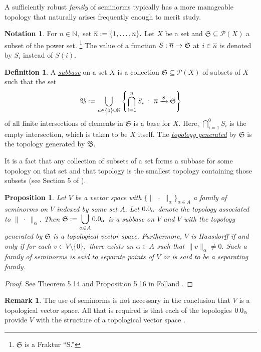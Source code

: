 \documentclass[12pt]{article}
\edef\t{\pgfmathresult}%
\theoremstyle{theorem}
\newtheorem{proposition}[equation]{Proposition}
\theoremstyle{definition}
\newtheorem{definition}[equation]{Definition}
\newtheorem{remark}[equation]{Remark}
\newtheorem{notation}[equation]{Notation}
\numberwithin{equation}{section}
\let\a=\alpha \let\b=\beta \let\g=\gamma \let\de=\delta \let\e=\epsilon
\newcommand{\be}{\begin{equation}}
\newcommand{\ee}{\end{equation}}
\newcommand{\bn}{\begin{proposition}}
\newcommand{\en}{\end{proposition}}
\newcommand{\bd}{\begin{definition}}
\newcommand{\ed}{\end{definition}}
\newcommand{\bprf}{\begin{proof}}
\newcommand{\eprf}{\end{proof}}
\newcommand{\br}{\begin{remark}}
\newcommand{\er}{\end{remark}}
\newcommand{\<}{\langle}
\renewcommand{\>}{\rangle}
\def\N{{{\mathbb N}}}
\newcommand{\ds}{\displaystyle}
\begin{document}
A sufficiently robust 
\emph{family} of seminorms typically has a more manageable topology
that naturally arises frequently enough to merit study. 

\begin{notation}
\label{not:nset}
For $n\in\N,$ set $\overline n:=\{1,\dots,n\}.$ Let $X$ be a set and 
$\mathfrak{S}\subseteq\mathcal{P}(X)$ a subset of the power set.%
\footnote{$\mathfrak{S}$ is a Fraktur ``S.''}
The value of a function $S:\overline n\to\mathfrak{S}$ at $i\in\overline n$ is
denoted by $S_{i}$ instead of $S(i).$ 
\end{notation}

\bd
\label{defn:subbase}
A \emph{\uline{subbase}} on a set $X$ is
a collection $\mathfrak{S}\subseteq\mathcal{P}(X)$ of
subsets of $X$ such that the set
\be
\mathfrak{B}:=
\bigcup_{n\in\{0\}\cup\N}
\left\{\bigcap_{i=1}^{n}S_{i}\;:\;\ov n\xrightarrow{S}\mathfrak{S}\right\}
\ee
of all finite intersections of elements in $\mathfrak{S}$ is a base
for $X.$ Here, $\ds\bigcap_{i=1}^{0}S_{i}$ is the empty intersection,
which is taken to be $X$ itself. 
The \emph{\uline{topology generated}} by $\mathfrak{S}$ 
is the topology generated by $\mathfrak{B}.$ 
\ed

It is a fact that any collection of
subsets of a set forms a subbase for some topology on that set 
and that topology is the smallest topology containing those subsets 
(see Section 5 of \cite{Wi04}).

\bn
\label{prop:familyoftopologies}
Let $V$ be a vector space with $\{\lVert\;\cdot\;\rVert_{\a}\}_{\a\in A}$ a
family of seminorms on $V$ indexed by some set $A.$ 
Let $\t_{\a}$ denote the topology 
associated to $\lVert\;\cdot\;\rVert_{\a}.$ 
Then $\ds\mathfrak{S}:=\bigcup_{\a\in A}\t_{\a}$
is a subbase on $V$ and 
$V$ with the topology generated by $\mathfrak{S}$ 
is a topological vector space. Furthermore, $V$ is 
Hausdorff if and only if for each $v\in V\setminus\{0\},$ there
exists an $\a\in A$ such that $\lVert v\rVert_{\a}\ne 0.$
Such a family of seminorms is said to \emph{\uline{separate points}} of $V$ 
or is said to be a \emph{\uline{separating family}}. 
\en

\bprf
See Theorem 5.14 and Proposition 5.16 in Folland \cite{Fo07}.
\eprf

\br
The use of seminorms is not necessary in the conclusion that $V$
is a topological vector space. All that is required
is that each of the topologies $\t_{\a}$ provide $V$ with the structure
of a topological vector space \cite{Ta09_245B11}. 
\er
\end{document}
